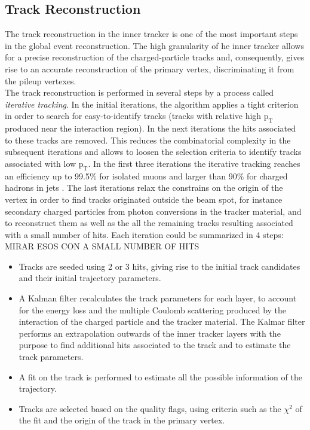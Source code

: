 \subsection{Track Reconstruction}
\label{subsec:TrackReco}
The track reconstruction in the inner tracker is one of the most important steps in the global event reconstruction. The high granularity of 
he inner tracker allows for a precise reconstruction of the charged-particle tracks and, consequently, gives rise to an accurate reconstruction 
of the primary vertex, discriminating it from the pileup vertexes. \\

The track reconstruction is performed in several steps by a process called \textit{iterative tracking}. In the initial iterations, 
the algorithm applies a tight criterion in order to search for  easy-to-identify tracks (tracks 
with relative high $\textrm{p}_{\textrm{T}}$ produced near the interaction region). In the next iterations the
hits associated to these tracks are removed. This reduces the combinatorial complexity in the subsequent iterations 
and allows to loosen the selection criteria to identify tracks associated with low $\textrm{p}_{\textrm{T}}$. In the first three iterations 
the iterative tracking reaches an efficiency up to 99.5$\%$ for isolated muons and larger than 90$\%$ for 
charged hadrons in jets \cite{CMS-PAS-PFT-09-001}. The last iterations relax the constrains on the origin of the vertex in order
to find tracks originated outside the beam spot, for instance secondary charged particles from photon conversions in the tracker material, 
and to reconstruct them as well as the all the remaining tracks resulting associated with a small number of hits. Each iteration could be summarized in 4 steps:\\

MIRAR ESOS CON A SMALL NUMBER OF HITS

\begin{itemize}
 \item Tracks are seeded using 2 or 3 hits, giving rise to the initial track candidates and their initial trajectory parameters.
 \item A Kalman filter \cite{Fruhwirth:1987fm} recalculates the track parameters for each layer, to account for the energy loss and the 
       multiple Coulomb scattering produced by the interaction of the charged particle and the tracker material. The Kalmar filter
       performs an extrapolation outwards of the inner tracker layers with the purpose to find additional hits associated to the track 
       and to estimate the track parameters.
 \item A fit on the track is performed to estimate all the possible information of the trajectory.
 \item Tracks are selected based on the quality flags, using criteria such as the $\chi^{2}$ of the fit and
 the origin of the track in the primary vertex.
\end{itemize}

